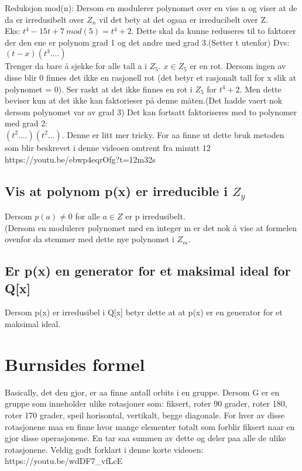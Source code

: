 \documentclass[12pt,a4paper]{article}
\begin{document}
Reduksjon mod(n): Dersom en modulerer polynomet over en viss n og viser at de da er irredusibelt over $Z_n$ vil det bety at det ogsaa er irreducibelt over Z.\\
Eks: $t^4 - 15t + 7\ mod(5) = t^4 + 2$. Dette skal da kunne reduseres til to faktorer der den ene er polynom grad 1 og det andre med grad 3.(Setter t utenfor) Dvs: $(t-x)(t^3 ....)$\\
Trenger da bare å sjekke for alle tall a i $Z_5$. $x\in Z_5$ er en rot. Dersom ingen av disse blir 0 finnes det ikke en rasjonell rot (det betyr et rasjonalt tall for x slik at polynomet = 0). Ser raskt at det ikke finnes en rot i $Z_5$ for $t^4 + 2$. Men dette beviser kun at det ikke kan faktorieser på denne måten.(Det hadde vaert nok dersom polynomet var av grad 3) Det kan fortsatt faktoriseres med to polynomer med grad 2: \\
$(t^2....)(t^2...)$. Denne er litt mer tricky. For aa finne ut dette bruk metoden som blir beskrevet i denne videoen omtrent fra minutt 12\\
https://youtu.be/ebwp4eqrOfg?t=12m32s

\subsection*{Vis at polynom p(x) er irreducible i $Z_y$}
Dersom $p(a) \neq 0$ for alle $a \in Z$ er p irredusibelt. \\
(Dersom en modulerer polynomet med en integer m er det nok å vise at formelen ovenfor da stemmer med dette nye polynomet i $Z_m$.


\subsection*{Er p(x) en generator for et maksimal ideal for Q[x]}
Dersom p(x) er irredusibel i Q[x] betyr dette at at p(x) er en generator for et maksimal ideal. 


\section*{Burnsides formel}
Basically, det den gjor, er aa finne antall orbits i en gruppe.
Dersom G er en gruppe som inneholder ulike rotasjoner som: fiksert, roter 90 grader, roter 180, roter 170 grader, speil horisontal, vertikalt, begge diagonale. For hver av disse rotasjonene maa en finne hvor mange elementer totalt som forblir fiksert naar en gjor disse operasjonene. En tar saa summen av dette og deler paa alle de ulike rotasjonene. Veldig godt forklart i denne korte videoen:\\
https://youtu.be/wdDF7\_vfLcE
\end{document}

